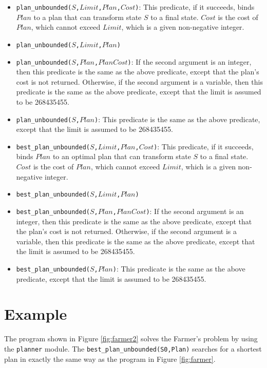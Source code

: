 \begin{itemize}
\item \texttt{plan\_unbounded($S$,$Limit$,$Plan$,$Cost$)}: This predicate, if it succeeds, binds $Plan$ to a plan that can transform state $S$ to a final state. $Cost$ is the cost of $Plan$, which cannot exceed $Limit$, which is a given non-negative integer.

\item \texttt{plan\_unbounded($S$,$Limit$,$Plan$)} 
\item \texttt{plan\_unbounded($S$,$Plan$,$PlanCost$)}: 
If the second argument is an integer, then this predicate is the same as the above predicate, except that the plan's cost is not returned. Otherwise, if the second argument is a variable, then this predicate is the same as the above predicate, except that the limit is assumed to be 268435455.

\item \texttt{plan\_unbounded($S$,$Plan$)}: This predicate is the same as the above predicate, except that the limit is assumed to be 268435455.

\item \texttt{best\_plan\_unbounded($S$,$Limit$,$Plan$,$Cost$)}: This predicate, if it succeeds, binds $Plan$ to an optimal plan that can transform state $S$ to a final state. $Cost$ is the cost of $Plan$, which cannot exceed $Limit$, which is a given non-negative integer.

\item \texttt{best\_plan\_unbounded($S$,$Limit$,$Plan$)} 
\item \texttt{best\_plan\_unbounded($S$,$Plan$,$PlanCost$)}: 
If the second argument is an integer, then this predicate is the same as the above predicate, except that the plan's cost is not returned. Otherwise, if the second argument is a variable, then this predicate is the same as the above predicate, except that the limit is assumed to be 268435455.

\item \texttt{best\_plan\_unbounded($S$,$Plan$)}: This predicate is the same as the above predicate, except that the limit is assumed to be 268435455.
\end{itemize}

\section{Example}
The program shown in Figure \ref{fig:farmer2} solves the Farmer's problem by using the \texttt{planner} module. The {\tt best\_plan\_unbounded(S0,Plan)} searches for a shortest plan in exactly the same way as the program in Figure \ref{fig:farmer}.

